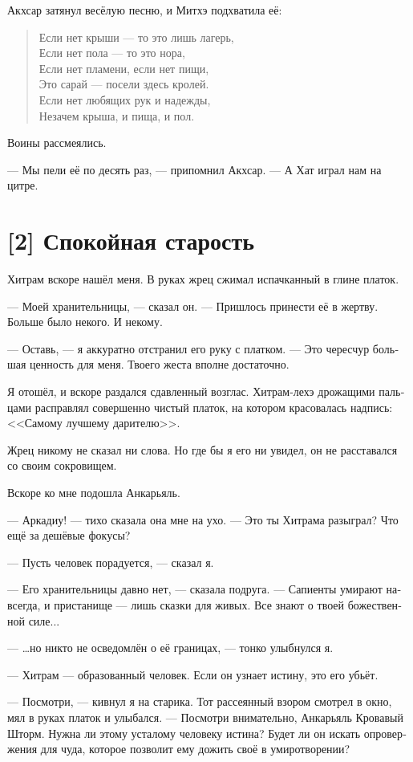 \documentclass[a4paper,12pt,fleqn]{book}\usepackage{cooltooltips}\usepackage{polyglossia}\setdefaultlanguage[babelshorthands=true]{russian}\setotherlanguage{english}\defaultfontfeatures{Ligatures=TeX,Mapping=tex-text} \usepackage{xcolor}\definecolor{lightgray}{HTML}{bbbbbb}\color{lightgray}\newcommand{\ml}[3]{\textenglish{\textcolor{black}{#3}}}
\begin{document}
{Акхсар затянул весёлую песню, и Митхэ подхватила её:

\begin{verse}
Если нет крыши --- то это лишь лагерь,\\
Если нет пола --- то это нора,\\
Если нет пламени, если нет пищи,\\
Это сарай --- посели здесь кролей.\\
Если нет любящих рук и надежды,\\
Незачем крыша, и пища, и пол.
\end{verse}

Воины рассмеялись.

--- Мы пели её по десять раз, --- припомнил Акхсар.
--- А Хат играл нам на цитре.

\section{[2] Спокойная старость}

Хитрам вскоре нашёл меня.
В руках жрец сжимал испачканный в глине платок.

--- Моей хранительницы, --- сказал он.
--- Пришлось принести её в жертву.
Больше было некого.
И некому.

--- Оставь, --- я аккуратно отстранил его руку с платком.
--- Это чересчур большая ценность для меня.
Твоего жеста вполне достаточно.

Я отошёл, и вскоре раздался сдавленный возглас.
Хитрам-лехэ дрожащими пальцами расправлял совершенно чистый платок, на котором красовалась надпись: <<Самому лучшему дарителю>>.

Жрец никому не сказал ни слова.
Но где бы я его ни увидел, он не расставался со своим сокровищем.

Вскоре ко мне подошла Анкарьяль.

--- Аркадиу! --- тихо сказала она мне на ухо.
--- Это ты Хитрама разыграл?
Что ещё за дешёвые фокусы?

--- Пусть человек порадуется, --- сказал я.

--- Его хранительницы давно нет, --- сказала подруга.
--- Сапиенты умирают навсегда, и пристанище --- лишь сказки для живых.
Все знают о твоей божественной силе...

--- \ldots но никто не осведомлён о её границах, --- тонко улыбнулся я.

--- Хитрам --- образованный человек.
Если он узнает истину, это его убьёт.

--- Посмотри, --- кивнул я на старика.
Тот рассеянный взором смотрел в окно, мял в руках платок и улыбался.
--- Посмотри внимательно, Анкарьяль Кровавый Шторм.
Нужна ли этому усталому человеку истина?
Будет ли он искать опровержения для чуда, которое позволит ему дожить своё в умиротворении?

}
\end{document}
